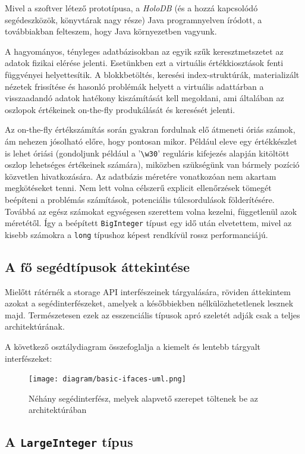 \documentclass[
    parspace,
    noindent,
    nohyp,
]{elteiktdk}[2023/04/10]
\begin{document}
Mivel a szoftver létező prototípusa, a \textit{HoloDB}
(és a hozzá kapcsolódó segédeszközök, könyvtárak nagy része) Java programnyelven íródott,
a továbbiakban felteszem, hogy Java környezetben vagyunk.

A hagyományos, tényleges adatbázisokban az egyik szűk keresztmetszetet
az adatok fizikai elérése jelenti.
Esetünkben ezt a virtuális értékkiosztások fenti függvényei helyettesítik.
A blokkbetöltés, keresési index-struktúrák, materializált nézetek frissítése
és hasonló problémák helyett a virtuális adattárban
a visszaadandó adatok hatékony kiszámítását kell megoldani,
ami általában az oszlopok értékeinek on-the-fly produkálását és keresését jelenti.

Az on-the-fly értékszámítás során gyakran fordulnak elő átmeneti óriás számok,
ám nehezen jósolható előre, hogy pontosan mikor.
Például eleve egy értékkészlet is lehet óriási
(gondoljunk például a '\texttt{{\textbackslash}w{30}}'
reguláris kifejezés alapján kitöltött oszlop lehetséges értékeinek számára),
miközben szükségünk van bármely pozíció közvetlen hivatkozására.
Az adatbázis méretére vonatkozóan nem akartam megkötéseket tenni.
Nem lett volna célszerű explicit ellenőrzések tömegét beépíteni
a problémás számítások, potenciális túlcsordulások földerítésére.
Továbbá az egész számokat egységesen szerettem volna kezelni, függetlenül azok méretétől.
Így a beépített \texttt{BigInteger} típust egy idő után elvetettem,
mivel az kisebb számokra a \texttt{long} típushoz képest rendkívül rossz performanciájú.

\subsection{A fő segédtípusok áttekintése}

Mielőtt rátérnék a storage API interfészeinek tárgyalására,
röviden áttekintem azokat a segédinterfészeket,
amelyek a későbbiekben nélkülözhetetlenek lesznek majd.
Természetesen ezek az esszenciális típusok apró szeletét adják csak a teljes architektúrának.

A következő osztálydiagram összefoglalja a kiemelt és lentebb tárgyalt interfészeket:

\begin{figure}[H]
\centering
\texttt{[image: diagram/basic-ifaces-uml.png]}
\caption[Alapvető segédinterfészek]{
    Néhány segédinterfész, melyek alapvető szerepet töltenek be az architektúrában
}
\end{figure}

\subsection{A \texttt{LargeInteger} típus}
\end{document}
